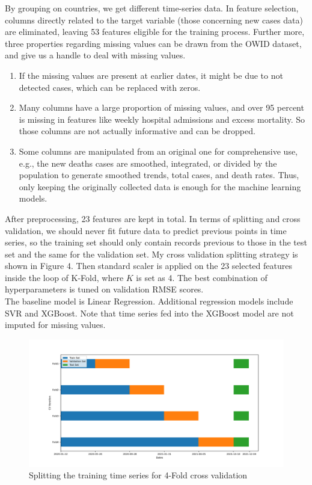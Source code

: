 \documentclass[11pt]{article}
\begin{document}
By grouping on countries, we get different time-series data. In feature selection, columns directly related to the target variable (those concerning new cases data) are eliminated, leaving 53 features eligible for the training process. Further more, three properties regarding missing values can be drawn from the OWID dataset, and give us a handle to deal with missing values.
\begin{enumerate}
	\item If the missing values are present at earlier dates, it might be due to not detected cases, which can be replaced with zeros.
	\item Many columns have a large proportion of missing values, and over 95 percent is missing in features like weekly hospital admissions and excess mortality. So those columns are not actually informative and can be dropped.
	\item Some columns are manipulated from an original one for comprehensive use, e.g., the new deaths cases are smoothed, integrated, or divided by the population to generate smoothed trends, total cases, and death rates. Thus, only keeping the originally collected data is enough for the machine learning models.
\end{enumerate}
After preprocessing, 23 features are kept in total. In terms of splitting and cross validation, we should never fit future data to predict previous points in time series, so the training set should only contain records previous to those in the test set and the same for the validation set. My cross validation splitting strategy is shown in Figure 4. Then standard scaler is applied on the 23 selected features inside the loop of K-Fold, where $K$ is set as 4. The best combination of hyperparameters is tuned on validation RMSE scores.\\

The baseline model is Linear Regression. Additional regression models include SVR and XGBoost. Note that time series fed into the XGBoost model are not imputed for missing values.
\begin{figure}[htb]
	\setlength{\abovecaptionskip}{0cm}
	\centering
	\includegraphics[width=0.8\linewidth]{../figures/Cross-validation.png} %
	\caption{Splitting the training time series for 4-Fold cross validation} 
\end{figure}
\end{document}
